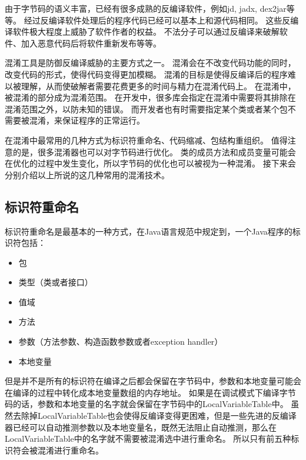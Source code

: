 由于字节码的语义丰富，已经有很多成熟的反编译软件，例如jd, jadx, dex2jar等等。
经过反编译软件处理后的程序代码已经可以基本上和源代码相同。
这些反编译软件极大程度上威胁了软件作者的权益。
不法分子可以通过反编译来破解软件、加入恶意代码后将软件重新发布等等。

混淆工具是防御反编译威胁的主要方式之一。
混淆会在不改变代码功能的同时，改变代码的形式，使得代码变得更加模糊。
混淆的目标是使得反编译后的程序难以被理解，从而使破解者需要花费更多的时间与精力在混淆代码上。
在混淆中，被混淆的部分成为混淆范围。
在开发中，很多库会指定在混淆中需要将其排除在混淆范围之外，以防未知的错误。
而开发者也有时需要指定某个类或者某个包不需要被混淆，来保证程序的正常运行。

在混淆中最常用的几种方式为标识符重命名、代码缩减、包结构重组织。
值得注意的是，很多混淆器也可以对字节码进行优化。
类的成员方法和成员变量可能会在优化的过程中发生变化，所以字节码的优化也可以被视为一种混淆。
接下来会分别介绍以上所说的这几种常用的混淆技术。

\subsection{标识符重命名}
标识符重命名是最基本的一种方式，在Java语言规范中规定到，一个Java程序的标识符包括：
\begin{itemize}
	\item 包
	\item 类型（类或者接口）
	\item 值域
	\item 方法
	\item 参数（方法参数、构造函数参数或者exception handler）
	\item 本地变量
\end{itemize}

但是并不是所有的标识符在编译之后都会保留在字节码中，参数和本地变量可能会在编译的过程中转化成本地变量数组的内存地址。
如果是在调试模式下编译字节码的话，参数和本地变量的名字就会保留在字节码中的LocalVariableTable中。
虽然去除掉LocalVariableTable也会使得反编译变得更困难，但是一些先进的反编译器已经可以自动推测参数以及本地变量名，既然无法阻止自动推测，那么在LocalVariableTable中的名字就不需要被混淆选中进行重命名。
所以只有前五种标识符会被混淆进行重命名。

